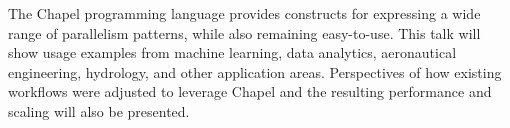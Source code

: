 The Chapel programming language provides constructs for expressing a wide range of parallelism patterns, while also remaining easy-to-use. This talk will show usage examples from machine learning, data analytics, aeronautical engineering, hydrology, and other application areas. Perspectives of how existing workflows were adjusted to leverage Chapel and the resulting performance and scaling will also be presented.